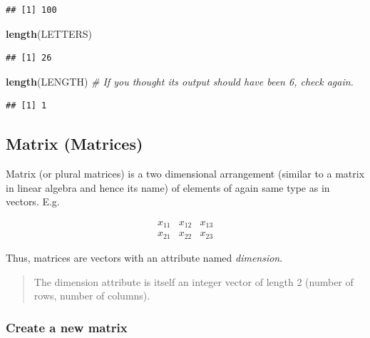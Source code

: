 \documentclass[
]{book}
\newenvironment{Shaded}{\begin{snugshade}}{\end{snugshade}}
\newcommand{\CommentTok}[1]{\textcolor[rgb]{0.56,0.35,0.01}{\textit{#1}}}
\newcommand{\FunctionTok}[1]{\textcolor[rgb]{0.13,0.29,0.53}{\textbf{#1}}}
\newcommand{\NormalTok}[1]{#1}
\newcommand{\StringTok}[1]{\textcolor[rgb]{0.31,0.60,0.02}{#1}}
\begin{document}
\begin{verbatim}
## [1] 100
\end{verbatim}

\begin{Shaded}
\begin{Highlighting}[]
\FunctionTok{length}\NormalTok{(LETTERS)}
\end{Highlighting}
\end{Shaded}

\begin{verbatim}
## [1] 26
\end{verbatim}

\begin{Shaded}
\begin{Highlighting}[]
\FunctionTok{length}\NormalTok{(}\StringTok{\textquotesingle{}LENGTH\textquotesingle{}}\NormalTok{) }\CommentTok{\# If you thought its output should have been 6, check again.}
\end{Highlighting}
\end{Shaded}

\begin{verbatim}
## [1] 1
\end{verbatim}

\hypertarget{matrix-matrices}{%
\subsection{Matrix (Matrices)}\label{matrix-matrices}}

Matrix (or plural matrices) is a two dimensional arrangement (similar to a matrix in linear algebra and hence its name) of elements of again same type as in vectors. E.g.

\[\begin{array}{ccc}
x_{11} & x_{12} & x_{13}\\
x_{21} & x_{22} & x_{23}
\end{array}\]

Thus, matrices are vectors with an attribute named \emph{dimension}.

\begin{quote}
The dimension attribute is itself an integer vector of length 2 (number of rows, number of columns).
\end{quote}

\hypertarget{create-a-new-matrix}{%
\subsubsection*{Create a new matrix}\label{create-a-new-matrix}}
\end{document}
